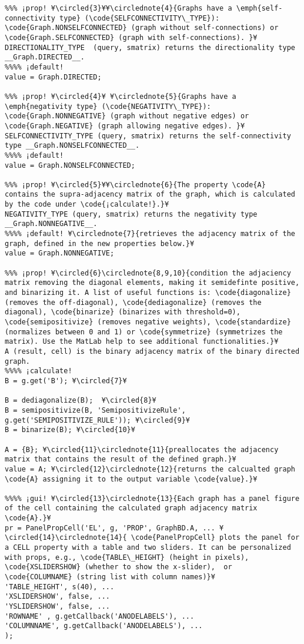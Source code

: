 \documentclass{tufte-handout}
\begin{document}
\begin{lstlisting}
%%% ¡prop! ¥\circled{3}¥¥\circlednote{4}{Graphs have a \emph{self-connectivity type} (\code{SELFCONNECTIVITY\_TYPE}): \code{Graph.NONSELFCONNECTED} (graph without self-connections) or \code{Graph.SELFCONNECTED} (graph with self-connections). }¥
DIRECTIONALITY_TYPE  (query, smatrix) returns the directionality type __Graph.DIRECTED__.
%%%% ¡default! 
value = Graph.DIRECTED;

%%% ¡prop! ¥\circled{4}¥ ¥\circlednote{5}{Graphs have a \emph{negativity type} (\code{NEGATIVITY\_TYPE}): \code{Graph.NONNEGATIVE} (graph without negative edges) or \code{Graph.NEGATIVE} (graph allowing negative edges). }¥
SELFCONNECTIVITY_TYPE (query, smatrix) returns the self-connectivity type __Graph.NONSELFCONNECTED__.
%%%% ¡default!
value = Graph.NONSELFCONNECTED;

%%% ¡prop! ¥\circled{5}¥¥\circlednote{6}{The property \code{A} contains the supra-adjacency matrix of the graph, which is calculated by the code under \code{¡calculate!}.}¥
NEGATIVITY_TYPE (query, smatrix) returns the negativity type __Graph.NONNEGATIVE__.
%%%% ¡default! ¥\circlednote{7}{retrieves the adjacency matrix of the graph, defined in the new properties below.}¥
value = Graph.NONNEGATIVE;

%%% ¡prop! ¥\circled{6}\circlednote{8,9,10}{condition the adjaciency matrix removing the diagonal elements, making it semidefinte positive, and binarizing it. A list of useful functions is: \code{diagonalize} (removes the off-diagonal), \code{dediagonalize} (removes the diagonal), \code{binarize} (binarizes with threshold=0), \code{semipositivize} (removes negative weights), \code{standardize} (normalizes between 0 and 1) or \code{symmetrize} (symmetrizes the matrix). Use the MatLab help to see additional functionalities.}¥
A (result, cell) is the binary adjacency matrix of the binary directed graph.
%%%% ¡calculate!
B = g.get('B'); ¥\circled{7}¥

B = dediagonalize(B);  ¥\circled{8}¥
B = semipositivize(B, 'SemipositivizeRule', g.get('SEMIPOSITIVIZE_RULE')); ¥\circled{9}¥
B = binarize(B); ¥\circled{10}¥

A = {B}; ¥\circled{11}\circlednote{11}{preallocates the adjacency matrix that contains the result of the defined graph.}¥
value = A; ¥\circled{12}\circlednote{12}{returns the calcualted graph \code{A} assigning it to the output variable \code{value}.}¥

%%%% ¡gui! ¥\circled{13}\circlednote{13}{Each graph has a panel figure of the cell containing the calculated graph adjacency matrix \code{A}.}¥
pr = PanelPropCell('EL', g, 'PROP', GraphBD.A, ... ¥\circled{14}\circlednote{14}{ \code{PanelPropCell} plots the panel for a CELL property with a table and two sliders. It can be personalized with props, e.g., \code{TABLE\_HEIGHT} (height in pixels), \code{XSLIDERSHOW} (whether to show the x-slider),  or \code{COLUMNAME} (string list with column names)}¥
'TABLE_HEIGHT', s(40), ... 
'XSLIDERSHOW', false, ... 
'YSLIDERSHOW', false, ...  
'ROWNAME' , g.getCallback('ANODELABELS'), ... 
'COLUMNNAME', g.getCallback('ANODELABELS'), ...
);


\end{lstlisting}
\end{document}
